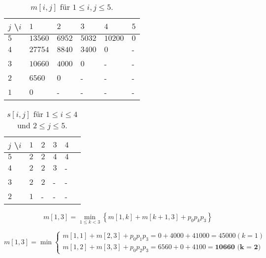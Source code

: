 \documentclass{article}
\begin{document}
\begin{minipage}{.45\textwidth}
\begin{table}[H]
  \centering
  \begin{tabular}{|l|l|l|l|l|l|}
  \hline
  $j$ \textbackslash $i$  & $1$     & $2$     & $3$     & $4$     & $5$ \tabularnewline
  \hline\hline
  $5$                     & $13560$ & $6952$  & $5032$  & $10200$ & $0$ \tabularnewline
  \hline
  $4$                     & $27754$ & $8840$  & $3400$  & $0$     & -   \tabularnewline
  \hline
  $3$                     & $10660$ & $4000$  & $0$     & -       & -   \tabularnewline
  \hline
  $2$                     & $6560$  & $0$     & -       & -       & -   \tabularnewline
  \hline
  $1$                     & $0$     & -       & -       & -       & -   \tabularnewline
  \hline\hline
  \end{tabular}
  \caption{$m[i, j]$ f{\"u}r $1 \leq i, j \leq 5$.}
  \label{tbl:m}
\end{table}
\end{minipage}
\begin{minipage}{.45\textwidth}
\begin{table}[H]
  \centering
  \begin{tabular}{|l|l|l|l|l|l|}
  \hline
  $j$ \textbackslash $i$  & $1$ & $2$  & $3$  & $4$ \tabularnewline
  \hline\hline
  $5$                     & $2$ & $2$  & $4$  & $4$ \tabularnewline
  \hline
  $4$                     & $2$ & $2$  & $3$  & -   \tabularnewline
  \hline
  $3$                     & $2$ & $2$  & -    & -   \tabularnewline
  \hline
  $2$                     & $1$ & -    & -    & -   \tabularnewline
  \hline\hline
  \end{tabular}
  \caption{$s[i, j]$ f{\"u}r $1 \leq i \leq 4$ und $2 \leq j \leq 5$.}
  \label{tbl:s}
\end{table}
\end{minipage}

\clearpage

\begin{equation}
m[1, 3] = \min\limits_{1 \leq k < 3} \left\{ m[1, k] + m[k + 1, 3] + p_0p_kp_3 \right\}
\end{equation}

\begin{equation}
m[1, 3] = \min\begin{cases}
  m[1, 1] + m[2, 3] + p_0p_1p_3 = 0 + 4000 + 41000 = 45000 (k = 1)\\
  m[1, 2] + m[3, 3] + p_0p_2p_3 = 6560 + 0 + 4100 = \textbf{10660 (k = 2)}
\end{cases}
\end{equation}
\end{document}
